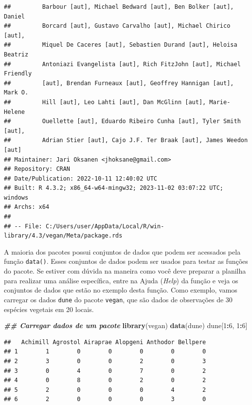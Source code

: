 \documentclass[
]{article}
\newenvironment{Shaded}{\begin{snugshade}}{\end{snugshade}}
\newcommand{\DecValTok}[1]{\textcolor[rgb]{0.00,0.00,0.81}{#1}}
\newcommand{\DocumentationTok}[1]{\textcolor[rgb]{0.56,0.35,0.01}{\textbf{\textit{#1}}}}
\newcommand{\FunctionTok}[1]{\textcolor[rgb]{0.13,0.29,0.53}{\textbf{#1}}}
\newcommand{\NormalTok}[1]{#1}
\newcommand{\SpecialCharTok}[1]{\textcolor[rgb]{0.81,0.36,0.00}{\textbf{#1}}}
\begin{document}
\begin{verbatim}
##         Barbour [aut], Michael Bedward [aut], Ben Bolker [aut], Daniel
##         Borcard [aut], Gustavo Carvalho [aut], Michael Chirico [aut],
##         Miquel De Caceres [aut], Sebastien Durand [aut], Heloisa Beatriz
##         Antoniazi Evangelista [aut], Rich FitzJohn [aut], Michael Friendly
##         [aut], Brendan Furneaux [aut], Geoffrey Hannigan [aut], Mark O.
##         Hill [aut], Leo Lahti [aut], Dan McGlinn [aut], Marie-Helene
##         Ouellette [aut], Eduardo Ribeiro Cunha [aut], Tyler Smith [aut],
##         Adrian Stier [aut], Cajo J.F. Ter Braak [aut], James Weedon [aut]
## Maintainer: Jari Oksanen <jhoksane@gmail.com>
## Repository: CRAN
## Date/Publication: 2022-10-11 12:40:02 UTC
## Built: R 4.3.2; x86_64-w64-mingw32; 2023-11-02 03:07:22 UTC; windows
## Archs: x64
## 
## -- File: C:/Users/user/AppData/Local/R/win-library/4.3/vegan/Meta/package.rds
\end{verbatim}

A maioria dos pacotes possui conjuntos de dados que podem ser acessados pela função \texttt{data()}. Esses conjuntos de dados podem ser usados para testar as funções do pacote. Se estiver com dúvida na maneira como você deve preparar a planilha para realizar uma análise específica, entre na Ajuda (\emph{Help}) da função e veja os conjuntos de dados que estão no exemplo desta função. Como exemplo, vamos carregar os dados \texttt{dune} do pacote \texttt{vegan}, que são dados de observações de 30 espécies vegetais em 20 locais.

\begin{Shaded}
\begin{Highlighting}[]
\DocumentationTok{\#\# Carregar dados de um pacote}
\FunctionTok{library}\NormalTok{(vegan)}
\FunctionTok{data}\NormalTok{(dune)}
\NormalTok{dune[}\DecValTok{1}\SpecialCharTok{:}\DecValTok{6}\NormalTok{, }\DecValTok{1}\SpecialCharTok{:}\DecValTok{6}\NormalTok{]}
\end{Highlighting}
\end{Shaded}

\begin{verbatim}
##   Achimill Agrostol Airaprae Alopgeni Anthodor Bellpere
## 1        1        0        0        0        0        0
## 2        3        0        0        2        0        3
## 3        0        4        0        7        0        2
## 4        0        8        0        2        0        2
## 5        2        0        0        0        4        2
## 6        2        0        0        0        3        0
\end{verbatim}
\end{document}
